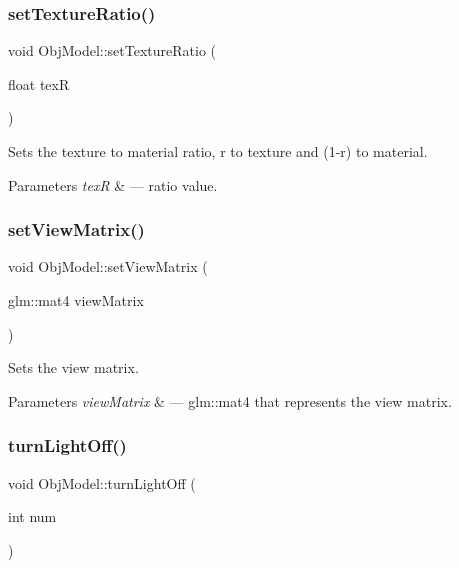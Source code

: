 \subsubsection{\texorpdfstring{set\+Texture\+Ratio()}{setTextureRatio()}}
{\footnotesize\ttfamily void Obj\+Model\+::set\+Texture\+Ratio (\begin{DoxyParamCaption}\item[{float}]{texR }\end{DoxyParamCaption})}



Sets the texture to material ratio, r to texture and (1-\/r) to material. 


\begin{DoxyParams}{Parameters}
{\em texR} & --- ratio value. \\
\hline
\end{DoxyParams}
\mbox{\label{class_obj_model_a579f8130f3f30d9a0bc8e8add3d585ed}} 
\subsubsection{\texorpdfstring{set\+View\+Matrix()}{setViewMatrix()}}
{\footnotesize\ttfamily void Obj\+Model\+::set\+View\+Matrix (\begin{DoxyParamCaption}\item[{glm\+::mat4}]{view\+Matrix }\end{DoxyParamCaption})}



Sets the view matrix. 


\begin{DoxyParams}{Parameters}
{\em view\+Matrix} & --- glm\+::mat4 that represents the view matrix. \\
\hline
\end{DoxyParams}
\mbox{\label{class_obj_model_abd41d77a204c443fd9f2bd94cda3a514}} 
\subsubsection{\texorpdfstring{turn\+Light\+Off()}{turnLightOff()}}
{\footnotesize\ttfamily void Obj\+Model\+::turn\+Light\+Off (\begin{DoxyParamCaption}\item[{int}]{num }\end{DoxyParamCaption})}



